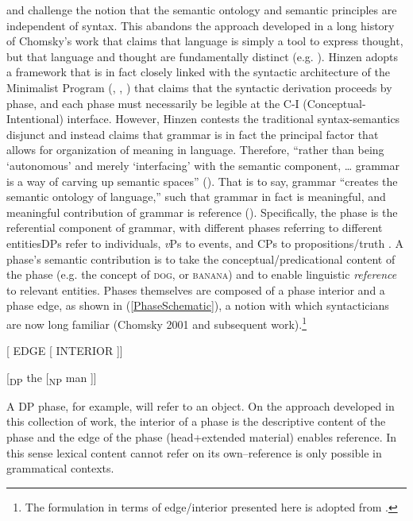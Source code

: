 \documentclass[output=paper
,modfonts
,nonflat
]{langsci/langscibook}
\begin{document}
\citet{Hinzen:2006, Hinzen:2012} and \citet{HinzenSheehan:2013} challenge the notion that the semantic ontology and semantic principles are independent of syntax. This abandons the approach developed in a long history of Chomsky’s work that claims that language is simply a tool to express thought, but that language and thought are fundamentally distinct (e.g. \citealt{Chomsky:2000b}). Hinzen adopts a framework that is in fact closely linked with the syntactic architecture of the Minimalist Program (\citealt{Chomsky2000}, \citealt{Chomsky:2001}, \citealt{Chomsky2008}) that claims that the syntactic derivation proceeds by phase, and each phase must necessarily be legible at the C-I (Conceptual-Intentional) interface. However, Hinzen contests the traditional syntax-semantics disjunct and instead claims that grammar is in fact the principal factor that allows for organization of meaning in language. Therefore, ``rather than being `autonomous' and merely `interfacing' with the semantic component, … grammar is a way of carving up semantic spaces'' (\citealt[311]{Hinzen:2012}).  That is to say, grammar ``creates the semantic ontology of language,'' such that grammar in fact is meaningful, and meaningful contribution of grammar is reference (\citealt[311]{Hinzen:2012}). Specifically, the phase is the referential component of grammar, with different phases referring to different entities\textemdash DPs refer to individuals, \textit{v}Ps to events, and CPs to propositions/truth \citep{HinzenSheehan:2013, SheehanHinzen:2011}.
A phase's semantic contribution is to take the conceptual/predicational content of the phase (e.g. the concept of \textsc{dog}, or \textsc{banana}) and to enable linguistic \textit{reference} to relevant entities. Phases themselves are composed of a phase interior and a phase edge, as shown in (\ref{PhaseSchematic}), a notion with which syntacticians are now long familiar (Chomsky 2001 and subsequent work).\footnote{The formulation in terms of edge/interior presented here is adopted from \citet{HinzenSheehan:2013}.} 



\ea	 \label{PhaseSchematic}
{[} EDGE [ INTERIOR ]]
\z

\ea 
{[}\textsubscript{DP} the [\textsubscript{NP} man ]]
\z

\noindent A DP phase, for example, will refer to an object. On the approach developed in this collection of work, the interior of a phase is the descriptive content of the phase and the edge of the phase (head+extended material) enables reference. In this sense lexical content cannot refer on its own–reference is only possible in grammatical contexts. 
\end{document}

